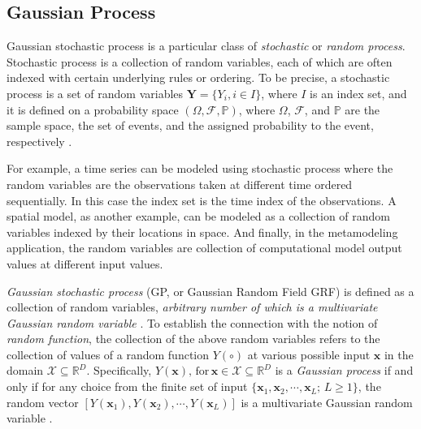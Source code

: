 \subsection{Gaussian Process}\label{sub:gp_gp}

Gaussian stochastic process is a particular class of \emph{stochastic} or \emph{random process}.
Stochastic process is a collection of random variables, each of which are often indexed with certain underlying rules or ordering.
To be precise, a stochastic process is a set of random variables $\mathbf{Y} = \{Y_i, i \in I\}$, where $I$ is an index set, 
and it is defined on a probability space $(\Omega, \mathcal{F}, \mathbb{P})$, 
where $\Omega$, $\mathcal{F}$, and $\mathbb{P}$ are the sample space, the set of events, and the assigned probability to the event, respectively \cite{Syski2014}.

For example, a time series can be modeled using stochastic process where the random variables are the observations taken at different time ordered sequentially.
In this case the index set is the time index of the observations.
A spatial model, as another example, can be modeled as a collection of random variables indexed by their locations in space.
And finally, in the metamodeling application, the random variables are collection of computational model output values at different input values.

\emph{Gaussian stochastic process} (GP, or Gaussian Random Field GRF) is defined as a collection of random variables, 
\emph{arbitrary number of which is a multivariate Gaussian random variable} \cite{Rasmussen2006, Debicki2014}.
To establish the connection with the notion of \emph{random function}, the collection of the above random variables refers to the collection of values of a random function $Y(\circ)$ at various possible input $\mathbf{x}$ in the domain $\mathcal{X} \subseteq \mathbb{R}^D$.
Specifically, $Y(\mathbf{x}), \, \text{for} \, \mathbf{x} \in \mathcal{X} \subseteq \mathbb{R}^D$ is a \emph{Gaussian process} if and only if for any choice from the finite set of input $\{\mathbf{x}_1, \mathbf{x}_2, \cdots, \mathbf{x}_L ; \, L \geq 1\}$, the random vector $\left[Y(\mathbf{x}_1), Y(\mathbf{x}_2), \cdots, Y(\mathbf{x}_L)\right]$ is a multivariate Gaussian random variable \cite{Santner2003}.

